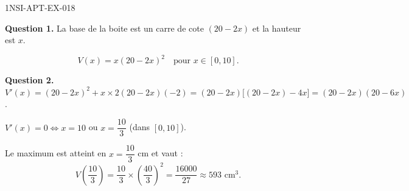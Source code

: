 \begin{corrige}{1NSI-APT-EX-018}

\textbf{Question 1.} La base de la boite est un carre de cote $(20 - 2x)$ et la hauteur est $x$.


\[ V(x) = x(20 - 2x)^2 \quad \text{pour } x \in [0, 10]. \]

\textbf{Question 2.} $V'(x) = (20-2x)^2 + x \times 2(20-2x)(-2) = (20-2x)\bigl[(20-2x) - 4x\bigr] = (20-2x)(20-6x)$.

$V'(x) = 0 \iff x = 10$ ou $x = \dfrac{10}{3}$ (dans $[0,10]$).

Le maximum est atteint en $x = \dfrac{10}{3}$ cm et vaut :
\[ V\!\left(\dfrac{10}{3}\right) = \dfrac{10}{3} \times \left(\dfrac{40}{3}\right)^2 = \dfrac{16000}{27} \approx 593 \text{ cm}^3. \]

\end{corrige}
